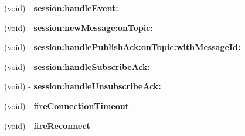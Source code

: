 \begin{DoxyCompactItemize}
(void) -\/ {\bfseries session\+:handle\+Event\+:}
\item 
\hypertarget{category_x_i_c_o_connection_07_x_i_c_o_connection_unit_test_08_ae640f5a764eea26612c58b42bd3c2bd1}{}\label{category_x_i_c_o_connection_07_x_i_c_o_connection_unit_test_08_ae640f5a764eea26612c58b42bd3c2bd1} 
(void) -\/ {\bfseries session\+:new\+Message\+:on\+Topic\+:}
\item 
\hypertarget{category_x_i_c_o_connection_07_x_i_c_o_connection_unit_test_08_a2c88a4f9b4ab1c8e47f35ed6eb9c7fe5}{}\label{category_x_i_c_o_connection_07_x_i_c_o_connection_unit_test_08_a2c88a4f9b4ab1c8e47f35ed6eb9c7fe5} 
(void) -\/ {\bfseries session\+:handle\+Publish\+Ack\+:on\+Topic\+:with\+Message\+Id\+:}
\item 
\hypertarget{category_x_i_c_o_connection_07_x_i_c_o_connection_unit_test_08_a7130d4d86acf007a59aee899342b8f8e}{}\label{category_x_i_c_o_connection_07_x_i_c_o_connection_unit_test_08_a7130d4d86acf007a59aee899342b8f8e} 
(void) -\/ {\bfseries session\+:handle\+Subscribe\+Ack\+:}
\item 
\hypertarget{category_x_i_c_o_connection_07_x_i_c_o_connection_unit_test_08_af24b05876b3306d9c21e882a631dd111}{}\label{category_x_i_c_o_connection_07_x_i_c_o_connection_unit_test_08_af24b05876b3306d9c21e882a631dd111} 
(void) -\/ {\bfseries session\+:handle\+Unsubscribe\+Ack\+:}
\item 
\hypertarget{category_x_i_c_o_connection_07_x_i_c_o_connection_unit_test_08_a4276d8620d817862d123c51d89dc5d68}{}\label{category_x_i_c_o_connection_07_x_i_c_o_connection_unit_test_08_a4276d8620d817862d123c51d89dc5d68} 
(void) -\/ {\bfseries fire\+Connection\+Timeout}
\item 
\hypertarget{category_x_i_c_o_connection_07_x_i_c_o_connection_unit_test_08_a6b3dbe546ba5180d269045bf1a996d97}{}\label{category_x_i_c_o_connection_07_x_i_c_o_connection_unit_test_08_a6b3dbe546ba5180d269045bf1a996d97} 
(void) -\/ {\bfseries fire\+Reconnect}
\end{DoxyCompactItemize}
